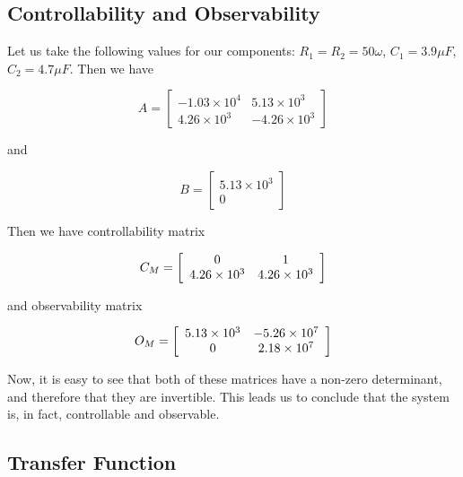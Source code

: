\documentclass[a4paper, 12pt]{article}
\begin{document}
\subsection{Controllability and Observability}

Let us take the following values for our components: $R_1 = R_2 = 50\omega$,
$C_1 = 3.9 \mu F$, $C_2 = 4.7 \mu F$. Then we have

\begin{equation}
  A = \left[
  \begin{array}{cc}
    -1.03 \times 10^4 & 5.13 \times 10^3 \\
    4.26 \times 10^3 & -4.26 \times 10^3
  \end{array}
  \right]
  \label{eq:q_A}
\end{equation}

\noindent and

\begin{equation}
  B = \left[
  \begin{array}{c}
    5.13 \times 10^3 \\
    0
  \end{array}
  \right]
  \label{eq:q_B}
\end{equation}

Then we have controllability matrix

\begin{equation}
  C_M = \left[
  \begin{array}{c c}
    0 & 1 \\
    4.26 \times 10^3 & 4.26 \times 10^3
  \end{array}
  \right]
  \label{eq:q_cm}
\end{equation}

and observability matrix

\begin{equation}
  O_M = \left[
  \begin{array}{c c}
    5.13 \times 10^3 & -5.26 \times 10^7 \\
    0 & 2.18 \times 10^7
  \end{array}
  \right]
  \label{eq:q_om}
\end{equation}

Now, it is easy to see that both of these matrices have a non-zero determinant,
and therefore that they are invertible. This leads us to conclude that the
system is, in fact, controllable and observable.

\subsection{Transfer Function}
\end{document}
